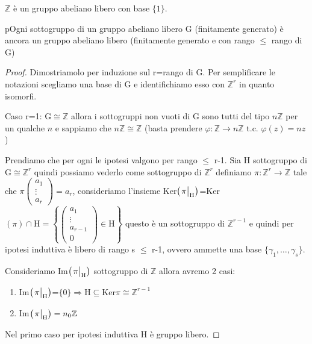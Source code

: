 \documentclass[11pt, a4paper, twoside]{article}
\begin{document}
\begin{es}
	$\mathbb{Z}$ è un gruppo abeliano libero con base $\{1\}$.
\end{es}
\label{sottogruppi}
\begin{thm}{}
	pOgni sottogruppo di un gruppo abeliano libero G (finitamente generato) è ancora un gruppo abeliano libero (finitamente generato e con rango $\leq$ rango di G)  
\end{thm}
\begin{proof}
	Dimostriamolo per induzione sul r=rango di G. Per semplificare le notazioni scegliamo una base di G e identifichiamo esso con $\mathbb{Z}^r$ in quanto isomorfi.

	Caso r=1: $\text{G}\cong\mathbb{Z}$ allora i sottogruppi non vuoti di G sono tutti del tipo $n\mathbb{Z}$ per un qualche $n$ e sappiamo che $n\mathbb{Z}\cong\mathbb{Z}$ (basta prendere $\varphi:\mathbb{Z}\rightarrow n\mathbb{Z}$ t.c. $\varphi(z)=nz$)

	Prendiamo che per ogni le ipotesi valgono per rango $\leq$ r-1. Sia H sottogruppo di $\text{G}\cong \mathbb{Z}^r$ quindi possiamo vederlo come sottogruppo di $\mathbb{Z}^r$ definiamo $\pi: \mathbb{Z}^r\rightarrow\mathbb{Z}$ tale che $\pi\left(\begin{smallmatrix}a_1\\\vdots\\a_r\end{smallmatrix}\right)=a_r$, consideriamo l'insieme Ker$\left(\eval{\pi}_{\text{H}}\right)$=Ker$(\pi)\cap\text{H}=\left\{\left(\begin{smallmatrix}a_1\\ \vdots \\a_{r-1}\\ 0\end{smallmatrix}\right)\in\text{H}\right\}$ questo è un sottogruppo di $\mathbb{Z}^{r-1}$ e quindi per ipotesi induttiva è libero di rango s $\leq$ r-1, ovvero ammette una base $\{\gamma_1,\dots,\gamma_s\}$.

	Consideriamo Im$\left(\eval{\pi}_{\text{H}}\right)$ sottogruppo di $\mathbb{Z}$ allora avremo 2 casi:
	\begin{enumerate}
		\item Im$\left(\eval{\pi}_{\text{H}}\right)$=$\{0\}\Rightarrow \text{H}\subseteq \text{Ker}\pi\cong\mathbb{Z}^{r-1}$
		\item Im$\left(\eval{\pi}_{\text{H}}\right)=n_0\mathbb{Z}$
	\end{enumerate}
	Nel primo caso per ipotesi induttiva H è gruppo libero. 


\end{proof}
\end{document}
